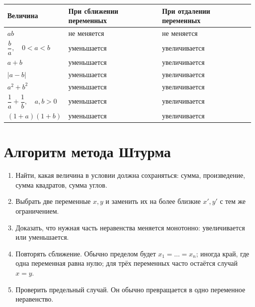 \begin{center}
\small
\setlength{\tabcolsep}{6pt}
\renewcommand{\arraystretch}{1.35}

\begin{tabularx}{\textwidth}{
    >{\centering\arraybackslash}p{}
    >{\centering\arraybackslash}X
    >{\centering\arraybackslash}X
}
\toprule
\textbf{Величина}
&
\textbf{При сближении переменных}
&
\textbf{При отдалении переменных}
\\
\midrule

$ab$
&
не меняется
&
не меняется
\\

\addlinespace[2mm]

$\dfrac ba,\quad 0<a<b$
&
уменьшается
&
увеличивается
\\

\addlinespace[2mm]

$a+b$
&
уменьшается
&
увеличивается
\\

\addlinespace[2mm]

$|a-b|$
&
уменьшается
&
увеличивается
\\

\addlinespace[2mm]

$a^2+b^2$
&
уменьшается
&
увеличивается
\\

\addlinespace[2mm]

$\dfrac1a+\dfrac1b,\quad a,b>0$
&
уменьшается
&
увеличивается
\\

\addlinespace[2mm]

$(1+a)(1+b)$
&
уменьшается
&
увеличивается
\\

\bottomrule
\end{tabularx}
\end{center}
\normalsize

\chapter{Алгоритм метода Штурма}

\begin{enumerate}[label=\textbf{Шаг \arabic*.}]
    \item Найти, какая величина в условии должна сохраняться: сумма, произведение, сумма квадратов, сумма углов.
    \item Выбрать две переменные $x,y$ и заменить их на более близкие $x',y'$ с тем же ограничением.
    \item Доказать, что нужная часть неравенства меняется монотонно: увеличивается или уменьшается.
    \item Повторять сближение. Обычно пределом будет $x_1=\ldots=x_n$; иногда край, где одна переменная равна нулю; для трёх переменных часто остаётся случай $x=y$.
    \item Проверить предельный случай. Он обычно превращается в одно переменное неравенство.
\end{enumerate}

